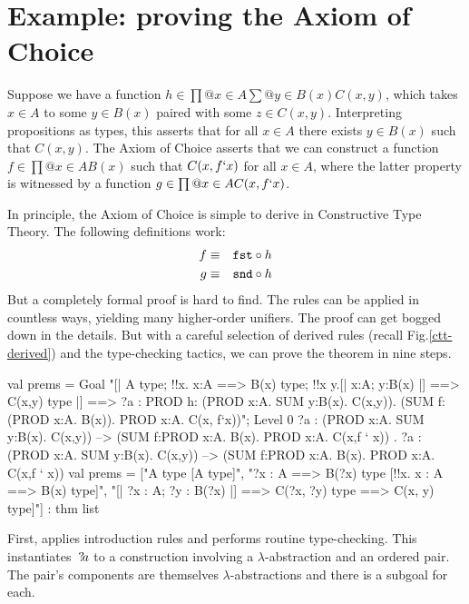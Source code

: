 \section{Example: proving the Axiom of Choice} \label{ctt-choice}
Suppose we have a function $h\in \prod@{x\in A}\sum@{y\in B(x)} C(x,y)$,
which takes $x\in A$ to some $y\in B(x)$ paired with some $z\in C(x,y)$.
Interpreting propositions as types, this asserts that for all $x\in A$
there exists $y\in B(x)$ such that $C(x,y)$.  The Axiom of Choice asserts
that we can construct a function $f\in \prod@{x\in A}B(x)$ such that
$C(x,f{\tt`}x)$ for all $x\in A$, where the latter property is witnessed by a
function $g\in \prod@{x\in A}C(x,f{\tt`}x)$.

In principle, the Axiom of Choice is simple to derive in Constructive Type
Theory.  The following definitions work:
\begin{eqnarray*}
    f & \equiv & {\tt fst} \circ h \\
    g & \equiv & {\tt snd} \circ h
\end{eqnarray*}
But a completely formal proof is hard to find.  The rules can be applied in
countless ways, yielding many higher-order unifiers.  The proof can get
bogged down in the details.  But with a careful selection of derived rules
(recall Fig.\ts\ref{ctt-derived}) and the type-checking tactics, we can
prove the theorem in nine steps.
\begin{ttbox}
val prems = Goal
    "[| A type;  !!x. x:A ==> B(x) type;                    \ttback
\ttback       !!x y.[| x:A;  y:B(x) |] ==> C(x,y) type            \ttback
\ttback    |] ==> ?a : PROD h: (PROD x:A. SUM y:B(x). C(x,y)).    \ttback
\ttback                     (SUM f: (PROD x:A. B(x)). PROD x:A. C(x, f`x))";
{\out Level 0}
{\out ?a : (PROD x:A. SUM y:B(x). C(x,y)) -->}
{\out      (SUM f:PROD x:A. B(x). PROD x:A. C(x,f ` x))}
{. ?a : (PROD x:A. SUM y:B(x). C(x,y)) -->}
{\out          (SUM f:PROD x:A. B(x). PROD x:A. C(x,f ` x))}
\ttbreak
{\out val prems = ["A type  [A type]",}
{\out              "?x : A ==> B(?x) type  [!!x. x : A ==> B(x) type]",}
{\out              "[| ?x : A; ?y : B(?x) |] ==> C(?x, ?y) type}
{\out               [!!x y. [| x : A; y : B(x) |] ==> C(x, y) type]"]}
{\out             : thm list}
\end{ttbox}
First,  applies introduction rules and performs routine
type-checking.  This instantiates~${?\!a}$ to a construction involving
a $\lambda$-abstraction and an ordered pair.  The pair's components are
themselves $\lambda$-abstractions and there is a subgoal for each.
